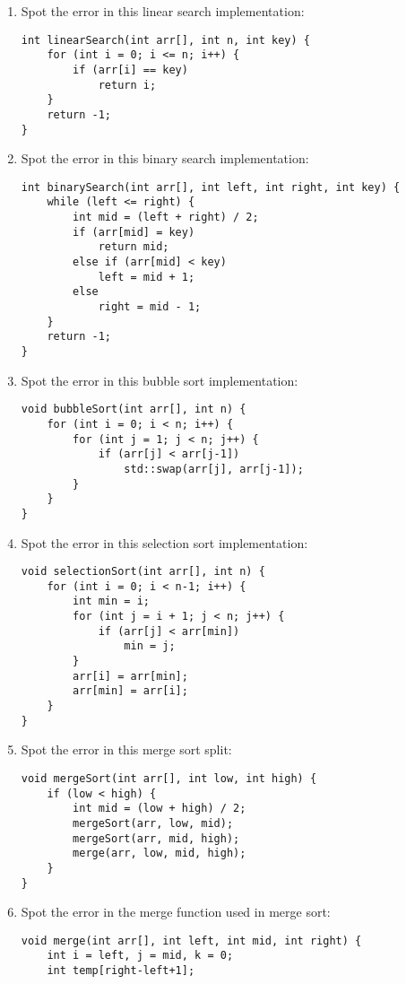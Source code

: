 \documentclass[a4paper,12pt]{article}
\begin{document}
\begin{enumerate}
    \item Spot the error in this linear search implementation:
\begin{lstlisting}
int linearSearch(int arr[], int n, int key) {
    for (int i = 0; i <= n; i++) {
        if (arr[i] == key)
            return i;
    }
    return -1;
}
\end{lstlisting}

    \item Spot the error in this binary search implementation:
\begin{lstlisting}
int binarySearch(int arr[], int left, int right, int key) {
    while (left <= right) {
        int mid = (left + right) / 2;
        if (arr[mid] = key)
            return mid;
        else if (arr[mid] < key)
            left = mid + 1;
        else
            right = mid - 1;
    }
    return -1;
}
\end{lstlisting}

    \item Spot the error in this bubble sort implementation:
\begin{lstlisting}
void bubbleSort(int arr[], int n) {
    for (int i = 0; i < n; i++) {
        for (int j = 1; j < n; j++) {
            if (arr[j] < arr[j-1])
                std::swap(arr[j], arr[j-1]);
        }
    }
}
\end{lstlisting}

    \item Spot the error in this selection sort implementation:
\begin{lstlisting}
void selectionSort(int arr[], int n) {
    for (int i = 0; i < n-1; i++) {
        int min = i;
        for (int j = i + 1; j < n; j++) {
            if (arr[j] < arr[min])
                min = j;
        }
        arr[i] = arr[min];
        arr[min] = arr[i];
    }
}
\end{lstlisting}

    \item Spot the error in this merge sort split:
\begin{lstlisting}
void mergeSort(int arr[], int low, int high) {
    if (low < high) {
        int mid = (low + high) / 2;
        mergeSort(arr, low, mid);
        mergeSort(arr, mid, high);
        merge(arr, low, mid, high);
    }
}
\end{lstlisting}

    \item Spot the error in the merge function used in merge sort:
\begin{lstlisting}
void merge(int arr[], int left, int mid, int right) {
    int i = left, j = mid, k = 0;
    int temp[right-left+1];
    

\end{lstlisting}
\end{enumerate}
\end{document}
